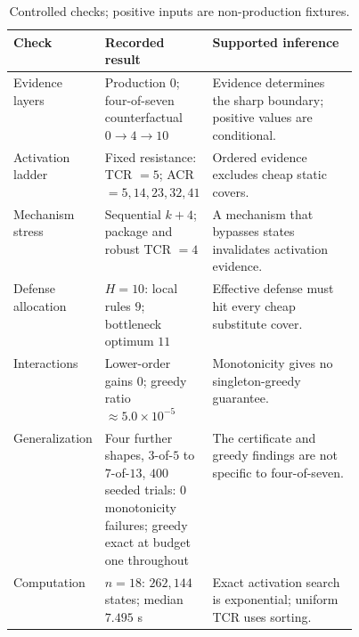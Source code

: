 \begin{table}[!b]
\centering
\captionsetup{font=scriptsize,skip=2pt}
\fontsize{7}{7.5}\selectfont
\setlength{\tabcolsep}{2pt}
\renewcommand{\arraystretch}{0.92}
\caption{Controlled checks; positive inputs are non-production fixtures.}
\label{tab:controlled-results}
\label{tab:evaluation-layers}
\label{tab:certificate-branch-results}
\label{tab:activation-ladder-certificate-gap}
\label{tab:mechanism-scope-stress-test}
\label{tab:defensive-allocation-comparison}
\label{tab:parameter-sensitivity}
\label{tab:baseline-comparison}
\label{tab:solver-scaling}
\label{tab:gnosis-counterfactual}
\begin{tabularx}{\linewidth}{
@{}
>{\RaggedRight\arraybackslash}p{0.15\linewidth}
>{\RaggedRight\arraybackslash}p{0.30\linewidth}
Y
@{}}
\toprule
Check & Recorded result & Supported inference\\
\midrule
Evidence layers
& Production \(0\); four-of-seven counterfactual
  \(0\to4\to10\)
& Evidence determines the sharp boundary; positive values are conditional.\\

Activation ladder
& Fixed resistance: TCR \(=5\); ACR
  \(=5,14,23,32,41\)
& Ordered evidence excludes cheap static covers.\\

Mechanism stress
& Sequential \(k+4\); package and robust TCR \(=4\)
& A mechanism that bypasses states invalidates activation evidence.\\

Defense allocation
& \(H=10\): local rules \(9\); bottleneck optimum \(11\)
& Effective defense must hit every cheap substitute cover.\\

Interactions
& Lower-order gains \(0\); greedy ratio
  \(\approx5.0\times10^{-5}\)
& Monotonicity gives no singleton-greedy guarantee.\\

Generalization
& Four further shapes, \(3\)-of-\(5\) to \(7\)-of-\(13\), \(400\) seeded
  trials: \(0\) monotonicity failures; greedy exact at budget one throughout
& The certificate and greedy findings are not specific to four-of-seven.\\

Computation
& \(n=18\): \(262{,}144\) states; median \(7.495\) s
& Exact activation search is exponential; uniform TCR uses sorting.\\
\bottomrule
\end{tabularx}
\end{table}

